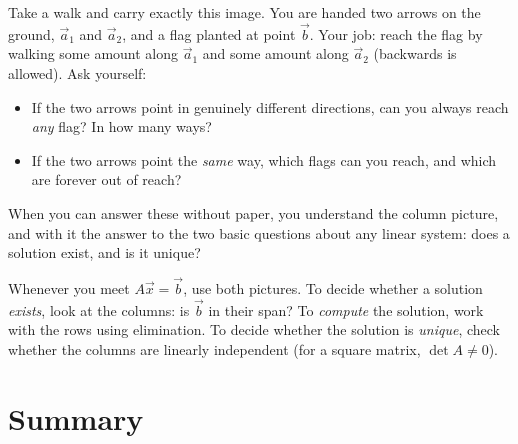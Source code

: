 \begin{walkbox}
Take a walk and carry exactly this image. You are handed two arrows on the
ground, $\vec a_1$ and $\vec a_2$, and a flag planted at point $\vec b$. Your
job: reach the flag by walking some amount along $\vec a_1$ and some amount
along $\vec a_2$ (backwards is allowed). Ask yourself:
\begin{itemize}
  \item If the two arrows point in genuinely different directions, can you
  always reach \emph{any} flag? In how many ways?
  \item If the two arrows point the \emph{same} way, which flags can you
  reach, and which are forever out of reach?
\end{itemize}
When you can answer these without paper, you understand the column
picture, and with it the answer to the two basic questions about any linear
system: does a solution exist, and is it unique?
\end{walkbox}

\begin{remark}
Whenever you meet $A\vec x=\vec b$, use both pictures.
To decide whether a solution \emph{exists}, look at the columns: is $\vec b$ in their
span? To \emph{compute} the solution, work with the rows using elimination.
To decide whether the solution is \emph{unique}, check whether the columns are
linearly independent (for a square matrix, $\det A \neq 0$).
\end{remark}

\section{Summary}

